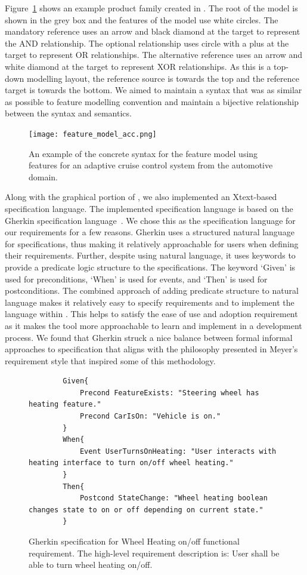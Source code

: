 Figure~\ref{fig:concrete_syntax_feat_mod} shows an example product family created in \tool. The root of the model is shown in the grey box and the features of the model use white circles. The mandatory reference uses an arrow and black diamond at the target to represent the AND relationship. The optional relationship uses circle with a plus at the target to represent OR relationships. The alternative reference uses an arrow and white diamond at the target to represent XOR relationships. As this is a top-down modelling layout, the reference source is towards the top and the reference target is towards the bottom. We aimed to maintain a syntax that was as similar as possible to feature modelling convention and maintain a bijective relationship between the syntax and semantics.

\begin{figure}[hbt!]
	\centering
	\texttt{[image: feature\_model\_acc.png]}
	\caption{An example of the concrete syntax for the feature model using features for an adaptive cruise control system from the automotive domain.}
	\label{fig:concrete_syntax_feat_mod}
\end{figure}

Along with the graphical portion of \tool, we also implemented an Xtext-based~\cite{eysholdt2010xtext} specification language. The implemented specification language is based on the Gherkin specification language~\cite{nicieja2017writing, cucumberdocs}. We chose this as the specification language for our requirements for a few reasons. Gherkin uses a structured natural language for specifications, thus making it relatively approachable for users when defining their requirements. Further, despite using natural language, it uses keywords to provide a predicate logic structure to the specifications. The keyword `Given' is used for preconditions, `When' is used for events, and `Then' is used for postconditions. The combined approach of adding predicate structure to natural language makes it relatively easy to specify requirements and to implement the language within \tool. This helps to satisfy the ease of use and adoption requirement as it makes the tool more approachable to learn and implement in a development process. We found that Gherkin struck a nice balance between formal informal approaches to specification that aligns with the philosophy presented in Meyer's requirement style that inspired some of this methodology.

\begin{figure}
	\begin{lstlisting}
		Given{
			Precond FeatureExists: "Steering wheel has heating feature."
			Precond CarIsOn: "Vehicle is on."
		}
		When{
			Event UserTurnsOnHeating: "User interacts with heating interface to turn on/off wheel heating."
		}
		Then{
			Postcond StateChange: "Wheel heating boolean changes state to on or off depending on current state."
		}
	\end{lstlisting}
	\caption{Gherkin specification for Wheel Heating on/off functional requirement. The high-level requirement description is: User shall be able to turn wheel heating on/off.}
	\label{fig:specification}
\end{figure}

